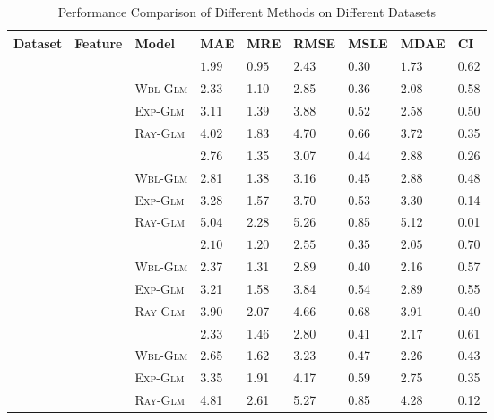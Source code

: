 \begin{table}[t]
	\scriptsize
	\centering
	\caption{Performance Comparison of Different Methods on Different Datasets}
	\label{table:results2}
	\begin{tabu} to \columnwidth {c c l X[r] X[r] X[r] X[r] X[r] X[r]}
		\toprule
		Dataset & Feature &
		Model &  MAE &   MRE &   RMSE &   MSLE &   MDAE &  CI \\
		\midrule
		& 
		& \npglm  &  $\bm{1.99}$ &  $\bm{0.95}$ &   $\bm{2.43}$ &   $\bm{0.30}$ &  $\bm{1.73}$ & $\bm{0.62}$ \\
		& & \textsc{Wbl-Glm} &  2.33 &  1.10 &   2.85 &   0.36 &   2.08 & 0.58 \\
		& & \textsc{Exp-Glm} &  3.11 &  1.39 &   3.88 &   0.52 &   2.58 & 0.50 \\
		& & \textsc{Ray-Glm} &  4.02 &  1.83 &   4.70 &   0.66 &   3.72 & 0.35 \\
		
		&                                                   
		& \npglm               &  2.76 &  1.35 &   3.07 &   0.44 &   2.88 & 0.26 \\
		& & \textsc{Wbl-Glm}     &  2.81 &  1.38 &   3.16 &   0.45 &   2.88 & 0.48 \\
		& & \textsc{Exp-Glm}     &  3.28 &  1.57 &   3.70 &   0.53 &   3.30 & 0.14 \\
		& & \textsc{Ray-Glm}     &  5.04 &  2.28 &   5.26 &   0.85 &   5.12 & 0.01 \\
		
		\midrule
		& 
		& \npglm  &  $\bm{2.10}$ &  $\bm{1.20}$ &   $\bm{2.55}$ &   $\bm{0.35}$ &   $\bm{2.05}$ & $\bm{0.70}$ \\
		& & \textsc{Wbl-Glm} &  2.37 &  1.31 &   2.89 &   0.40 &   2.16 & 0.57 \\
		& & \textsc{Exp-Glm} &  3.21 &  1.58 &   3.84 &   0.54 &   2.89 & 0.55 \\
		& & \textsc{Ray-Glm} &  3.90 &  2.07 &   4.66 &   0.68 &   3.91 & 0.40 \\
		
		&                                                   
		& \npglm               &  2.33 &  1.46 &   2.80 &   0.41 &   2.17 & 0.61 \\
		& & \textsc{Wbl-Glm}     &  2.65 &  1.62 &   3.23 &   0.47 &   2.26 & 0.43 \\
		& & \textsc{Exp-Glm}     &  3.35 &  1.91 &   4.17 &   0.59 &   2.75 & 0.35 \\
		& & \textsc{Ray-Glm}     &  4.81 &  2.61 &   5.27 &   0.85 &   4.28 & 0.12 \\
		

\end{tabu}
\end{table}
